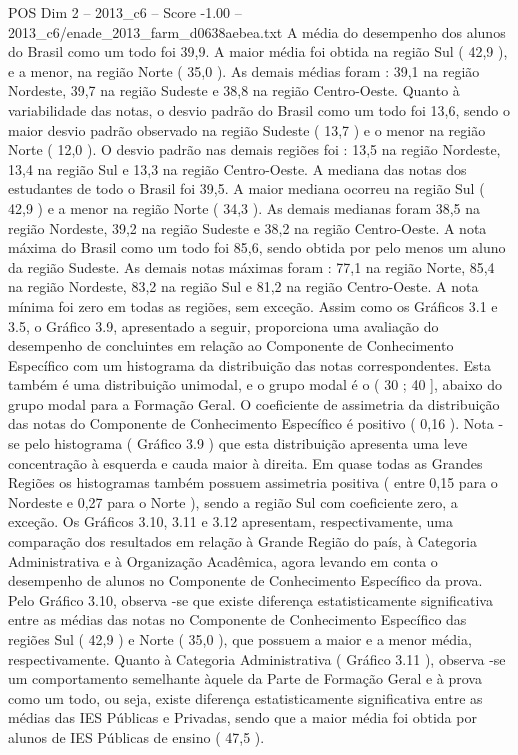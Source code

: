 \begin{textsample}{POS Dim 2 – 2013\_c6 – Score -1.00 – 2013\_c6/enade\_2013\_farm\_d0638aebea.txt}
A média do desempenho dos alunos do Brasil como um todo foi 39,9.
A maior média foi obtida na região Sul ( 42,9 ), e a menor, na região Norte ( 35,0 ).
As demais médias foram : 39,1 na região Nordeste, 39,7 na região Sudeste e 38,8 na região Centro-Oeste.
Quanto à variabilidade das notas, o desvio padrão do Brasil como um todo foi 13,6, sendo o maior desvio padrão observado na região Sudeste ( 13,7 ) e o menor na região Norte ( 12,0 ).
O desvio padrão nas demais regiões foi : 13,5 na região Nordeste, 13,4 na região Sul e 13,3 na região Centro-Oeste.
A mediana das notas dos estudantes de todo o Brasil foi 39,5.
A maior mediana ocorreu na região Sul ( 42,9 ) e a menor na região Norte ( 34,3 ).
As demais medianas foram 38,5 na região Nordeste, 39,2 na região Sudeste e 38,2 na região Centro-Oeste.
A nota máxima do Brasil como um todo foi 85,6, sendo obtida por pelo menos um aluno da região Sudeste.
As demais notas máximas foram : 77,1 na região Norte, 85,4 na região Nordeste, 83,2 na região Sul e 81,2 na região Centro-Oeste.
A nota mínima foi zero em todas as regiões, sem exceção.
Assim como os Gráficos 3.1 e 3.5, o Gráfico 3.9, apresentado a seguir, proporciona uma avaliação do desempenho de concluintes em relação ao Componente de Conhecimento Específico com um histograma da distribuição das notas correspondentes.
Esta também é uma distribuição unimodal, e o grupo modal é o ( 30 ; 40 ], abaixo do grupo modal para a Formação Geral.
O coeficiente de assimetria da distribuição das notas do Componente de Conhecimento Específico é positivo ( 0,16 ).
Nota -se pelo histograma ( Gráfico 3.9 ) que esta distribuição apresenta uma leve concentração à esquerda e cauda maior à direita.
Em quase todas as Grandes Regiões os histogramas também possuem assimetria positiva ( entre 0,15 para o Nordeste e 0,27 para o Norte ), sendo a região Sul com coeficiente zero, a exceção.
Os Gráficos 3.10, 3.11 e 3.12 apresentam, respectivamente, uma comparação dos resultados em relação à Grande Região do país, à Categoria Administrativa e à Organização Acadêmica, agora levando em conta o desempenho de alunos no Componente de Conhecimento Específico da prova.
Pelo Gráfico 3.10, observa -se que existe diferença estatisticamente significativa entre as médias das notas no Componente de Conhecimento Específico das regiões Sul ( 42,9 ) e Norte ( 35,0 ), que possuem a maior e a menor média, respectivamente.
Quanto à Categoria Administrativa ( Gráfico 3.11 ), observa -se um comportamento semelhante àquele da Parte de Formação Geral e à prova como um todo, ou seja, existe diferença estatisticamente significativa entre as médias das IES Públicas e Privadas, sendo que a maior média foi obtida por alunos de IES Públicas de ensino ( 47,5 ).

\end{textsample}
